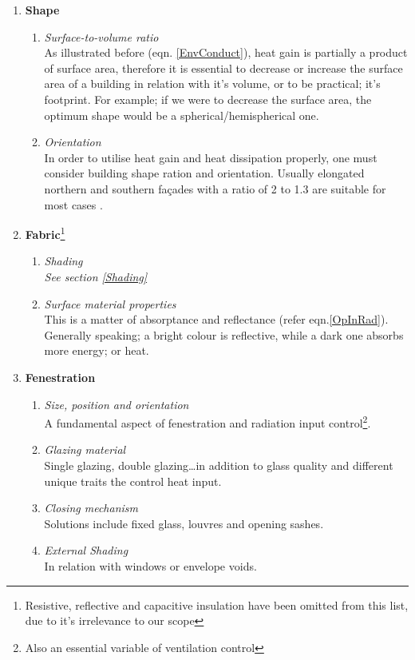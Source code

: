 \begin{enumerate}
  \item \textbf{Shape}
  	\begin{enumerate}
    	\item \emph{Surface-to-volume ratio}\\ As illustrated before (eqn. \ref{EnvConduct}), heat gain
    	is partially a product of surface area, therefore it is essential to decrease or increase the
    	surface area of a building in relation with it's volume, or to be practical; it's footprint.
   		For example; if we were to decrease the surface area, the optimum shape would be a
    	spherical/hemispherical one. 
    	\item \emph{Orientation}\\ In order to utilise heat gain and heat dissipation properly, one
    	must consider building shape ration and orientation. Usually elongated northern and southern
    	fa\c{c}ades with a ratio of 2 to 1.3 are suitable for most cases \cite{szokolay08}.
  	\end{enumerate}
  \item \textbf{Fabric}\footnote{Resistive, reflective and capacitive insulation have been
  omitted from this list, due to it's irrelevance to our scope}
  	\begin{enumerate}
    	\item \emph{Shading}\\ \emph{See section \ref{Shading}}
    	\item \emph{Surface material properties}\\ This is a matter of absorptance and reflectance
    	(refer eqn.\ref{OpInRad}). Generally speaking; a bright colour is reflective, while a dark
    	one absorbs more energy; or heat.
  \end{enumerate}
  \item \textbf{Fenestration}
  	\begin{enumerate}
  	  \item \emph{Size, position and orientation}\\ A fundamental aspect of fenestration and
  	  radiation input control\footnote{Also an essential variable of ventilation control}.
  	  \item \emph{Glazing material}\\ Single glazing, double glazing\ldots in addition to glass
  	  quality and different unique traits the control heat input.
  	  \item \emph{Closing mechanism}\\ Solutions include fixed glass, louvres and opening sashes.
  	  \item \emph{External Shading}\\ In relation with windows or envelope voids.
  	\end{enumerate}
\end{enumerate}
